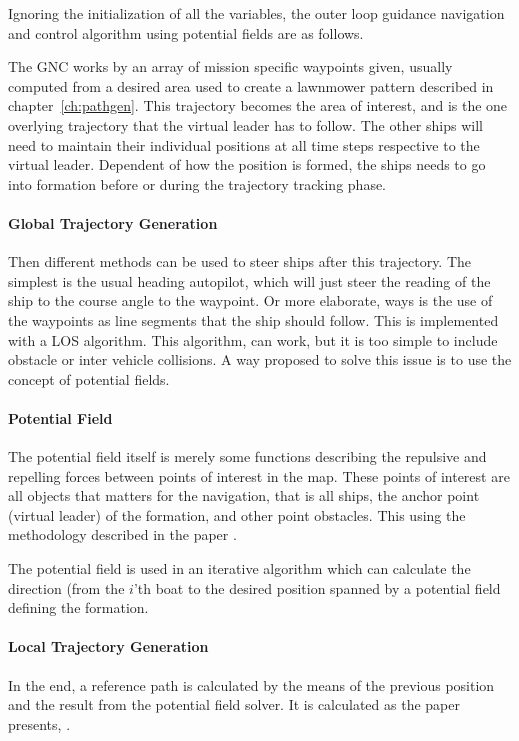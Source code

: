Ignoring the initialization of all the variables, the outer loop
guidance navigation and control algorithm using potential fields are
as follows.

The \ac{GNC} works by an array of mission specific waypoints given,
usually computed from a desired area used to create a lawnmower
pattern described in chapter~\vref{ch:pathgen}. This trajectory becomes the area of interest, and is the one overlying trajectory that the virtual leader has to follow. The other ships will need to maintain their individual positions at all time steps respective to the virtual leader. Dependent of how the position is formed, the ships needs to go into formation before or during the trajectory tracking phase.

\paragraph{Global Trajectory Generation}
Then different methods can be used to steer ships after this
trajectory. The simplest is the usual heading autopilot, which will
just steer the reading of the ship to the course angle to the
waypoint. Or more elaborate, ways is the use of the waypoints as
line segments that the ship should follow. This is implemented with a
\ac{LOS} algorithm. This algorithm, can work, but it is too simple to
include obstacle or inter vehicle collisions. A way proposed to solve
this issue is to use the concept of potential fields.

\paragraph{Potential Field}
The potential field itself is merely some functions describing the
repulsive and repelling forces between points of interest in the map.
These points of interest are all objects that matters for the
navigation, that is all ships, the anchor point (virtual leader) of
the formation, and other point obstacles. This using the methodology
described in the paper \citep{UAVff3dpf}.

The potential field is used in an iterative algorithm which can
calculate the direction (from the $i$'th boat to the desired position
spanned by a potential field defining the formation.

\paragraph{Local Trajectory Generation}
In the end, a reference path is calculated by the means of the
previous position and the result from the potential field
solver. It is calculated as the paper presents, \citep[eq.
48]{UAVff3dpf}.

